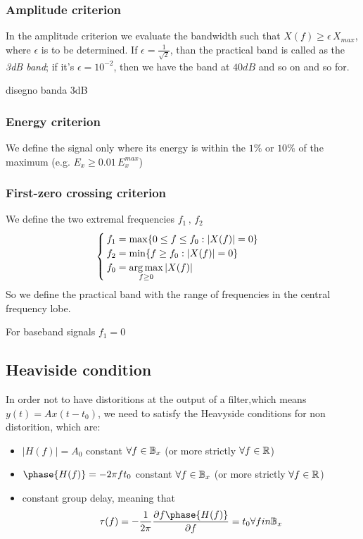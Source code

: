 \subsubsection{Amplitude criterion}
In the amplitude criterion we evaluate the bandwidth such that $X(f) \ge \epsilon \, X_{max}$, where $\epsilon$ is to be determined.
If $\epsilon = \frac{1}{\sqrt{2}}$, than the practical band is called as the \emph{3dB band}; if it's $\epsilon= 10^{-2}$, then we have the band at $40dB$ and so on and so for.

disegno banda 3dB
\subsubsection{Energy criterion}
We define the signal only where its energy is within the $1\%$ or $10\%$ of the maximum (e.g. $E_x \ge 0.01 \, E_x^{max}$)

\subsubsection{First-zero crossing criterion}
We define the two extremal frequencies $f_1 \, , \, f_2$
\begin{equation}\begin{cases}
  f_1 = \max \lbrace 0 \le f \le f_0  : |X(f)|=0\rbrace\\
  f_2 = \min \lbrace f \ge f_0  : |X(f)|=0\rbrace\\
  f_0 = \operatorname*{arg\,max}\limits_{f \ge 0} |X(f)|
\end{cases}\end{equation}
So we define the practical band with the range of frequencies in the central frequency lobe.
\begin{remark}
  For baseband signals $f_1  = 0$
\end{remark}

\subsection{Heaviside condition}
In order not to have distoritions at the output of a filter,which means $y(t) = A x(t-t_0)$, we need to satisfy the Heavyside conditions for non distorition, which are:
\begin{itemize}
  \item $|H(f)| = A_0$ constant $\forall f \in \mathbb{B}_x$ (or more strictly $\forall f \in \mathbb{R}$)
  \item $\phase{H(f)} = -2\pi f t_0$ constant $\forall f \in \mathbb{B}_x$ (or more strictly $\forall f \in \mathbb{R}$)
  \item constant group delay, meaning that
  \begin{equation}
    \tau(f) = -\frac{1}{2\pi}\frac{\partial{f}{\phase{H(f)}}}{\partial f} = t_0 \forall f in \B_x
  \end{equation}
\end{itemize}

